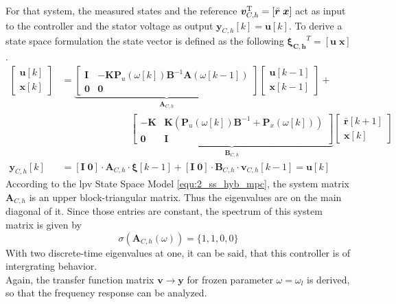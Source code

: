 For that system, the measured states and the reference $ \bm{v}_{C,h}^{\mathrm{T}} = [\bar{\bm{r}}\;{\bm{x}}]$ act as input to the controller and the stator voltage as output $\bm{y}_{C,h}[k] = \bm{u}[k]$. To derive a state space formulation the state vector is defined as the following $\bm{\xi_{C,h}}^T = [\bm{u}\; \bm{x}]$.
\begin{align}
	\begin{bmatrix}
		\bm{u}[k] \\\bm{x}[k]
	\end{bmatrix} &= 
	\underbrace{
		\begin{bmatrix}
			\bm{I} & -\bm{K} \bm{P}_u(\omega[k]) \bm{B}^{-1} \bm{A}(\omega[k-1]) \\
			\bm{0} & \bm{0}
	\end{bmatrix}}_{\bm{A}_{C,h}}
	\begin{bmatrix}
		\bm{u}[k-1] \\\bm{x}[k-1]
	\end{bmatrix} + \\ & \hspace{3cm}
	\underbrace{
		\begin{bmatrix}
			-\bm{K} & \bm{K}\left(\bm{P}_u(\omega[k]) \bm{B}^{-1} +  \bm{P}_x(\omega[k]) \right) \\
			 \bm{0} & \bm{I} 
	\end{bmatrix}}_{\bm{B}_{C,h}}
	\begin{bmatrix}
		\bar{\bm r}[k+1]\\
		\bm x[k]
	\end{bmatrix}
	\\
	\bm{y}_{C,h}[k] &= [\bm{I} \; \bm{0}] \cdot \bm{A}_{C,h} \cdot \bm{\xi}[k-1]+ [\bm{I} \; \bm{0}] \cdot \bm{B}_{C,h} \cdot  \bm{v}_{C,h}[k-1] = \bm{u}[k]
	\label{equ:2_ss_hyb_mpc}
\end{align}
According to the \acrshort{lpv} State Space Model \eqref{equ:2_ss_hyb_mpc}, the system matrix $\bm{A}_{C,h}$ is an upper block-triangular matrix. Thus the eigenvalues are on the main diagonal of it. Since those entries are constant, the spectrum of this system matrix is given by
\begin{equation*}
\sigma \left( \bm{A}_{C,h} \left(\omega\right) \right) = \{1, 1, 0, 0\} 
\end{equation*}
With two discrete-time eigenvalues at one, it can be said, that this controller is of intergrating behavior. \\
Again, the transfer function matrix $\bm{v} \rightarrow \bm{y}$ for frozen parameter $\omega = \omega_l$ is derived, so that the frequency response can be analyzed. 


